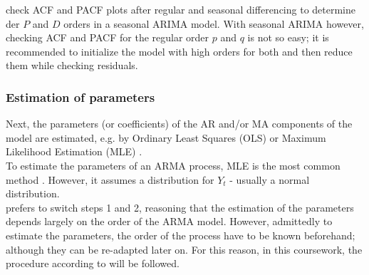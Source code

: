 \documentclass[a4paper, 11pt]{article}
\begin{document}
\cite{Vogel.2015} check ACF and PACF plots after regular and seasonal differencing to determine der $P$ and $D$ orders in a seasonal ARIMA model. With seasonal ARIMA however, checking ACF and PACF for the regular order $p$ and $q$ is not so easy; it is recommended to initialize the model with high orders for both and then reduce them while checking residuals. 

\subsubsection{Estimation of parameters}
Next, the parameters (or coefficients) of the AR and/or MA components of the model are estimated, e.g. by Ordinary Least Squares (OLS) or Maximum Likelihood Estimation (MLE) \citep{Andreoni.2006b}.  \\
To estimate the parameters of an ARMA process, MLE is the most common method \citep{Vogel.2015}. However, it assumes a distribution for $Y_{t}$ - usually a normal distribution.
\\
\cite{Vogel.2015} prefers to switch steps 1 and 2, reasoning that the estimation of the parameters depends largely on the order of the ARMA model. However, admittedly to estimate the parameters, the order of the process have to be known beforehand; although they can be re-adapted later on.
For this reason, in this coursework, the procedure according to \cite{Box.1976} will be followed.\\
\\
\end{document}
